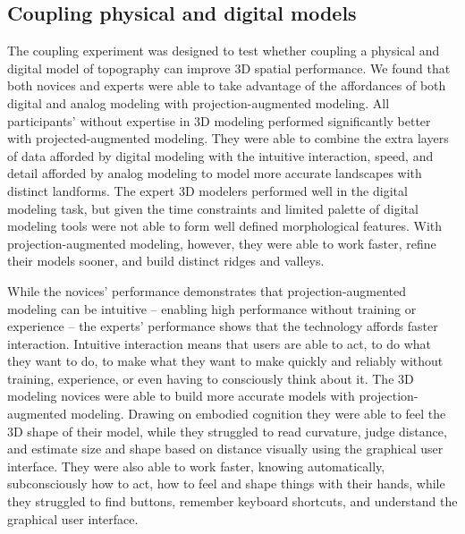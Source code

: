 \documentclass[prodmode,acmtochi]{acmsmall} %
\begin{document}
%
%
%
 
 

\subsection{Coupling physical and digital models} 
%
The coupling experiment was designed to test whether 
coupling a physical and digital model of topography 
can improve 3D spatial performance. 
%
We found that 
both novices and experts were able to take advantage
of the affordances of both digital and analog modeling
with projection-augmented modeling. 
All participants' without expertise in 3D modeling 
performed significantly better 
with projected-augmented modeling.
%
They were able to combine 
the extra layers of data afforded by digital modeling
with the intuitive interaction, speed, and detail
afforded by analog modeling 
to model more accurate landscapes
with distinct landforms. 
%
The expert 3D modelers performed well in the digital modeling task, 
but given the time constraints and limited palette of digital modeling tools
were not able to form well defined morphological features. 
%
With projection-augmented modeling, however,
they were able to work faster, refine their models sooner,
and build distinct ridges and valleys. 

While the novices' performance demonstrates 
that projection-augmented modeling can be intuitive 
-- enabling high performance without training or experience --
the experts' performance shows that the technology
affords faster interaction. 
% 
Intuitive interaction means that users are able to act, 
to do what they want to do, 
to make what they want to make 
quickly and reliably
without training, experience, or even having to consciously think about it. 
%
The 3D modeling novices
were able to build more accurate models
with projection-augmented modeling.
Drawing on embodied cognition 
they were able to feel the 3D shape of their model, 
while they struggled 
to read curvature, judge distance, 
and estimate size and shape based on distance 
visually using the graphical user interface. 
%
They were also able to work faster, 
knowing automatically, subconsciously how to act, 
how to feel and shape things with their hands,
while they struggled to find buttons, remember keyboard shortcuts,
and understand the graphical user interface. 
\end{document}
